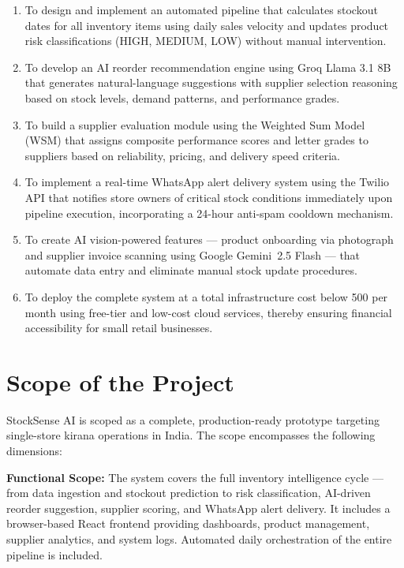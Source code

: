 \begin{enumerate}[label=\textbf{\arabic*.}, leftmargin=*, itemsep=4pt]
  \item To design and implement an automated pipeline that calculates stockout dates for all
        inventory items using daily sales velocity and updates product risk classifications
        (HIGH, MEDIUM, LOW) without manual intervention.

  \item To develop an AI reorder recommendation engine using Groq Llama 3.1 8B that generates
        natural-language suggestions with supplier selection reasoning based on stock levels,
        demand patterns, and performance grades.

  \item To build a supplier evaluation module using the Weighted Sum Model (WSM) that assigns
        composite performance scores and letter grades to suppliers based on reliability,
        pricing, and delivery speed criteria.

  \item To implement a real-time WhatsApp alert delivery system using the Twilio API that
        notifies store owners of critical stock conditions immediately upon pipeline execution,
        incorporating a 24-hour anti-spam cooldown mechanism.

  \item To create AI vision-powered features — product onboarding via photograph and supplier
        invoice scanning using Google Gemini~2.5 Flash — that automate data entry and eliminate
        manual stock update procedures.

  \item To deploy the complete system at a total infrastructure cost below \rupee{}500 per
        month using free-tier and low-cost cloud services, thereby ensuring financial
        accessibility for small retail businesses.
\end{enumerate}

\section{Scope of the Project}

StockSense AI is scoped as a complete, production-ready prototype targeting single-store kirana
operations in India. The scope encompasses the following dimensions:

\textbf{Functional Scope:} The system covers the full inventory intelligence cycle — from data
ingestion and stockout prediction to risk classification, AI-driven reorder suggestion, supplier
scoring, and WhatsApp alert delivery. It includes a browser-based React frontend providing
dashboards, product management, supplier analytics, and system logs. Automated daily orchestration
of the entire pipeline is included.

